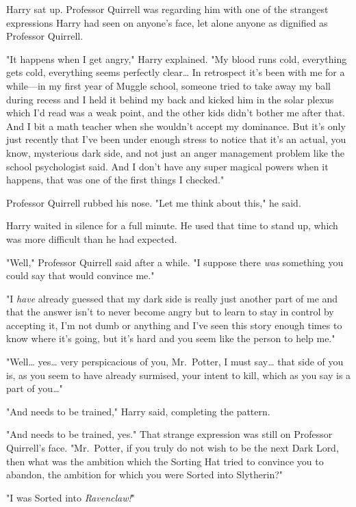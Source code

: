 Harry sat up. Professor Quirrell was regarding him with one of the strangest 
expressions Harry had seen on anyone's face, let alone anyone as dignified as 
Professor Quirrell.

"It happens when I get angry," Harry explained. "My blood runs cold, everything 
gets cold, everything seems perfectly clear{\ldots} In retrospect it's been 
with me for a while---in my first year of Muggle school, someone tried to take 
away my ball during recess and I held it behind my back and kicked him in the 
solar plexus which I'd read was a weak point, and the other kids didn't bother 
me after that. And I bit a math teacher when she wouldn't accept my dominance. 
But it's only just recently that I've been under enough stress to notice that 
it's an actual, you know, mysterious dark side, and not just an anger 
management problem like the school psychologist said. And I don't have any 
super magical powers when it happens, that was one of the first things I 
checked."

Professor Quirrell rubbed his nose. "Let me think about this," he said.

Harry waited in silence for a full minute. He used that time to stand up, which 
was more difficult than he had expected.

"Well," Professor Quirrell said after a while. "I suppose there \emph{was} 
something you could say that would convince me."

"I \emph{have} already guessed that my dark side is really just another part of 
me and that the answer isn't to never become angry but to learn to stay in 
control by accepting it, I'm not dumb or anything and I've seen this story 
enough times to know where it's going, but it's hard and you seem like the 
person to help me."

"Well{\ldots} yes{\ldots} very perspicacious of you, Mr.~Potter, I must 
say{\ldots} that side of you is, as you seem to have already surmised, your 
intent to kill, which as you say is a part of you{\ldots}"

"And needs to be trained," Harry said, completing the pattern.

"And needs to be trained, yes." That strange expression was still on Professor 
Quirrell's face. "Mr.~Potter, if you truly do not wish to be the next Dark 
Lord, then what was the ambition which the Sorting Hat tried to convince you to 
abandon, the ambition for which you were Sorted into Slytherin?"

"I was Sorted into \emph{Ravenclaw!}"

